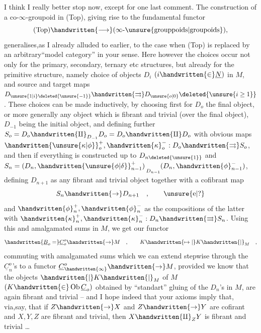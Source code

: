 
 I think I really better stop now, except for one last comment. The construction of a co-$\infty$-groupoid in (Top), giving rise to the fundamental functor
\[
(\mathrm{Top})\handwritten{\longrightarrow}(\infty\text{-}\unsure{\text{grouppoids}|\text{groupoids}}),
\]
generalises,as I already alluded to earlier, to the case when (Top) is replaced by an arbitrary``model category'' in your sense. Here however the choices occur not only  for the primary, secondary, ternary etc structures, but already for the primitive structure, namely  choice of objects $D_i$ $(i\handwritten{\in}\underline{N})$ in $M$, and source and target maps $D_{\unsure{1|i}\deleted{\unsure{-1}}}\handwritten{\rightrightarrows}D_{\unsure{o|0}}\deleted{\unsure{i\geq1}}$. These choices can be made inductively, by choosing first for $D_o$ the final object, or more generally any object which is fibrant and trivial (over the final object), $D_{-1}$ being the initial object, and defining further $S_o=D_o\handwritten{\amalg}_{D_{-1}}D_o=D_o\handwritten{\amalg}D_o$ with obvious maps ${\handwritten{\unsure{\kappa|\phi}}}_o^{+},\handwritten{\kappa}_o^{-}:D_o\handwritten{\rightrightarrows}S_o$, and then if everything is constructed up to $D_{n\deleted{\unsure{1}}}$\deleted{\unsure{)}} and $S_n=(D_n,{\handwritten{\unsure{\phi|\delta}}}_{n-1}^{+})\mathop{\phantom{\amalg}}\limits_{D_{n-1}}(D_n,\handwritten{\phi}_{n-1}^{-})$, defining $D_{n+1}$ as any fibrant and trivial object together with a cofibrant map
\[
S_n\handwritten{\to}D_{n+1}\quad ,\qquad \unsure{\mathrm{e}|?}
\]
and $\handwritten{\phi}_n^+,\handwritten{\phi}_n^-$ as the compositions of the latter with $\handwritten{\kappa}_n^+,\handwritten{\kappa}_n^-:D_n\handwritten{\rightrightarrows}S_n$. Using this and amalgamated sums in $M$, we get our functor
\[
\handwritten{\underline{B}_o =} \underline{C}_o^{o}\handwritten{\to}M\quad ,\qquad K\handwritten{\mapsto|}K\handwritten{|}_M\quad ,
\]
commuting with amalgamated sums which we can extend stepwise through the $\underline{C}_n^{o}$'s to a functor $\underline{C}_{\handwritten{\infty}}^{o}\handwritten{\to}M$, provided we know that the objects $\handwritten{|}K\handwritten{|}_M$ of $M$ $(K\handwritten{\in}\operatorname{Ob}\underline{C}_o)$ obtained  by ``standart'' gluing of the $D_n$'s in $M$, are again fibrant and trivial -- and I hope indeed that your axioms imply that, via,say, that if $Z\handwritten{\to}X$ and $Z\handwritten{\to}Y$ are cofirant and $X,Y,Z$ are fibrant and trivial, then $X\handwritten{\amalg}_ZY$ is fibrant and trivial \ldots

